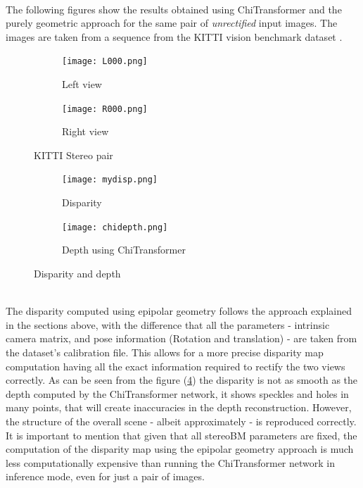 \documentclass[12pt]{amsart}
\begin{document}
\\
The following figures show the results obtained using ChiTransformer and the purely geometric approach for the same
pair of \textit{unrectified} input images. The images are taken from a sequence from the KITTI vision benchmark dataset \cite{Geiger2013IJRR}.
\begin{figure}[h]
    \centering
    \begin{subfigure}{.5\textwidth}
      \centering
      \texttt{[image: L000.png]}
      \caption{Left view}
      \label{fig:0left}
    \end{subfigure}%
    \begin{subfigure}{.5\textwidth}
      \centering
      \texttt{[image: R000.png]}
      \caption{Right view}
      \label{fig:0right}
    \end{subfigure}
    \caption{KITTI Stereo pair}
    \label{fig:kitti}
\end{figure}
\begin{figure}[h]
    \centering
    \begin{subfigure}{.5\textwidth}
      \centering
      \texttt{[image: mydisp.png]}
      \caption{Disparity}
      \label{fig:mydepth}
    \end{subfigure}%
    \begin{subfigure}{.5\textwidth}
      \centering
      \texttt{[image: chidepth.png]}
      \caption{Depth using ChiTransformer}
      \label{fig:kittidepth}
    \end{subfigure}
    \caption{Disparity and depth}
    \label{fig:comparison}
\end{figure}
\\
The disparity computed using epipolar geometry follows the approach explained in the sections above, with the difference that all the parameters 
- intrinsic camera matrix, and pose information (Rotation and translation) - are taken from the dataset's calibration file. 
This allows for a more precise disparity map computation having all the exact information required to rectify the two views correctly.
As can be seen from the figure (\ref{fig:mydepth}) the disparity is not as smooth as the depth computed by the ChiTransformer network,
it shows speckles and holes in many points, that will create inaccuracies in the depth reconstruction. 
However, the structure of the overall scene - albeit approximately - is reproduced correctly.
It is important to mention that given that all stereoBM parameters are fixed, the computation of the disparity map using the epipolar geometry approach is much less
computationally expensive than running the ChiTransformer network in inference mode, even for just a pair of images.
\printbibliography
\end{document}
